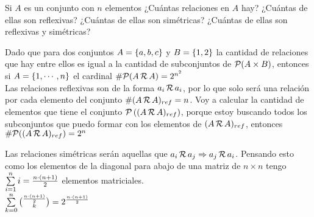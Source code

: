 \ejercicio
Si $A$ es un conjunto con $n$ elementos ¿Cuántas relaciones en $A$ hay?
¿Cuántas de ellas son reflexivas?
¿Cuántas de  ellas son simétricas? ¿Cuántas de ellas son reflexivas y simétricas? \\

\separadorCorto

Dado que para dos conjuntos $A = \left\{ a,b,c \right\}$ y $B = \left\{ 1,2 \right\}$ la cantidad de relaciones
que hay entre ellos es igual a la cantidad de subconjuntos de $\mathcal P(A \times B)$, entonces si
$A = \left\{ 1,\cdots, n \right\}$ el cardinal $\# \mathcal P(A \,\mathcal{R}\, A ) = 2^{n^2}$\\

Las relaciones reflexivas son de la forma $a_i \,\mathcal{R}\, a_i$, por lo que solo será una relación por cada
elemento del conjunto $\# (A \,\mathcal{R}\, A)_{ref} = n$. Voy a calcular la cantidad de elementos que tiene
el conjunto $\mathcal P \left(  (A \,\mathcal{R}\, A)_{ref}  \right)$, porque estoy buscando todos los subconjuntos que puedo
formar con los elementos de $(A \,\mathcal{R}\, A)_{ref}$, entonces $ \#\mathcal P((A \,\mathcal{R}\, A)_{ref}) = 2^n$\\

Las relaciones simétricas serán aquellas que $a_i \,\mathcal{R}\, a_j \Rightarrow a_j \,\mathcal{R}\, a_i$. Pensando esto como los elementos de la diagonal
para abajo de una matriz de $n\times n$ tengo $\sum\limits_{i=1}^{n} i = \frac{n \cdot (n+1)}{2}$ elementos matriciales.\\
$\sum\limits_{k = 0}^{n} \binom{\frac{n \cdot (n+1)}{2}}{k} = 2^{\frac{n \cdot (n+1)}{2}}$

